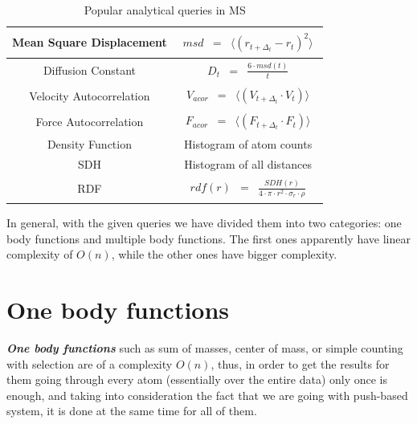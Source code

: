 \documentclass[11pt,a4paper]{report}
\begin{document}
\begin{table}[h]
{\begin{minipage}{\columnwidth}
\begin{tabular}{|c| c|}
\hline
Mean Square Displacement& $\begin{array} {lcl} msd & = & \langle (r_{t+\Delta_t}-r_t)^2 \rangle \end{array}$ \\[0.5ex]
\hline
Diffusion Constant & $\begin{array} {lcl} D_t & = & \frac{6 \cdot msd(t)}{t} \end{array}$ \\[0.5ex]
\hline Velocity Autocorrelation & $\begin{array} {lcl} V_{acor} & =&
\langle (V_{t+\Delta_t}\cdot V_t) \rangle \end{array}$ \\[0.5ex]
\hline
Force Autocorrelation & $\begin{array} {lcl} F_{acor} & = & \langle (F_{t+\Delta_t} \cdot F_t) \rangle \end{array}$ \\[0.5ex]
\hline
Density Function & Histogram of atom counts \\[0.5ex]
\hline
SDH & Histogram of all distances \\[0.5ex]
\hline
RDF & $\begin{array} {lcl} rdf(r) & = & \frac{SDH(r)}{4 \cdot \pi \cdot r^2 \cdot \sigma_r \cdot \rho} \end{array}$ \\[0.5ex]
\hline
\end{tabular}
\caption[Table caption text]{Popular analytical queries in MS\cite{mainPaper} }
\label{tb:queries}
\end{minipage} }
\end{table}

In general, with the given queries we have divided them into two categories: one body functions and multiple body functions. The first ones apparently have linear complexity of $O(n)$, while the other ones have bigger complexity. 

\section{One body functions}
\emph{\textbf{One body functions}} such as sum of masses, center of mass, or simple counting with selection  are of a complexity $O(n)$, thus, in order to get the results for them going through every atom (essentially over the entire data) only once is enough, and taking into consideration the fact that we are going with push-based system, it is done at the same time for all of them. 
\end{document}
